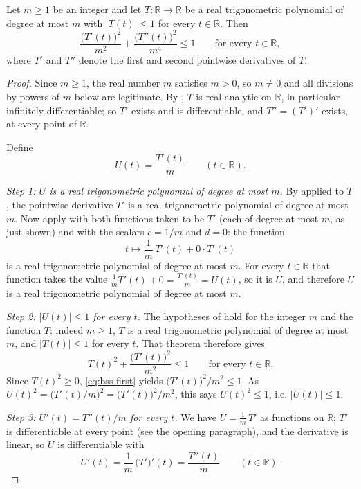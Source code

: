 \begin{corollary}
Let $m\ge1$ be an integer and let $T:\mathbb{R}\to\mathbb{R}$ be a real
trigonometric polynomial of degree at most $m$ with
$\lvert T(t)\rvert\le1$ for every $t\in\mathbb{R}$. Then
\[
  \frac{\bigl(T'(t)\bigr)^2}{m^2}+\frac{\bigl(T''(t)\bigr)^2}{m^4}\le1
  \qquad\text{for every }t\in\mathbb{R},
\]
where $T'$ and $T''$ denote the first and second pointwise derivatives of $T$.
\end{corollary}
\begin{proof}
Since $m\ge1$, the real number $m$ satisfies $m>0$, so $m\ne0$ and all divisions
by powers of $m$ below are legitimate. By , $T$ is
real-analytic on $\mathbb{R}$, in particular infinitely differentiable; so $T'$
exists and is differentiable, and $T''=(T')'$ exists, at every point of
$\mathbb{R}$.

Define
\[
  U(t)=\frac{T'(t)}{m}\qquad(t\in\mathbb{R}).
\]

\emph{Step 1: $U$ is a real trigonometric polynomial of degree at most $m$.} By
 applied to $T$, the pointwise derivative $T'$ is a real
trigonometric polynomial of degree at most $m$. Now apply
 with both functions taken to be $T'$ (each of degree at
most $m$, as just shown) and with the scalars $c=1/m$ and $d=0$: the function
\[
  t\mapsto \frac{1}{m}\,T'(t)+0\cdot T'(t)
\]
is a real trigonometric polynomial of degree at most $m$. For every
$t\in\mathbb{R}$ that function takes the value
$\frac{1}{m}T'(t)+0=\frac{T'(t)}{m}=U(t)$, so it is $U$, and therefore $U$ is a
real trigonometric polynomial of degree at most $m$.

\emph{Step 2: $\lvert U(t)\rvert\le1$ for every $t$.} The hypotheses of
 hold for the integer $m$ and the function $T$: indeed
$m\ge1$, $T$ is a real trigonometric polynomial of degree at most $m$, and
$\lvert T(t)\rvert\le1$ for every $t$. That theorem therefore gives
\begin{equation}\label{eq:bss-first}
  T(t)^2+\frac{\bigl(T'(t)\bigr)^2}{m^2}\le1
  \qquad\text{for every }t\in\mathbb{R}.
\end{equation}
Since $T(t)^2\ge0$, \eqref{eq:bss-first} yields
$\bigl(T'(t)\bigr)^2/m^2\le1$. As
$U(t)^2=\bigl(T'(t)/m\bigr)^2=\bigl(T'(t)\bigr)^2/m^2$, this says
$U(t)^2\le1$, i.e. $\lvert U(t)\rvert\le1$.

\emph{Step 3: $U'(t)=T''(t)/m$ for every $t$.} We have $U=\frac1m\,T'$ as
functions on $\mathbb{R}$; $T'$ is differentiable at every point (see the
opening paragraph), and the derivative is linear, so $U$ is differentiable with
\[
  U'(t)=\frac1m\,\bigl(T'\bigr)'(t)=\frac{T''(t)}{m}
  \qquad(t\in\mathbb{R}).
\]


\end{proof}
